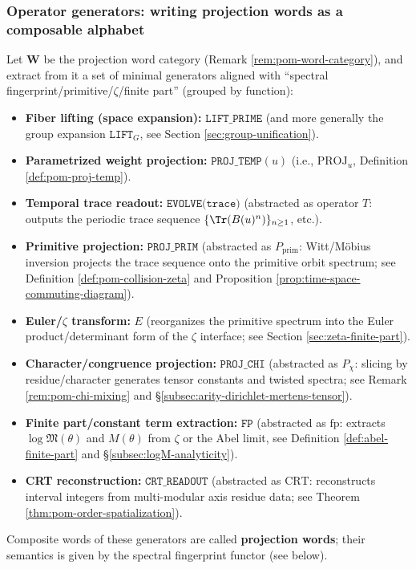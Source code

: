 \subsubsection{Operator generators: writing projection words as a composable alphabet}
\begin{definition}\label{def:pom-operator-generators-min}
Let \(\mathbf{W}\) be the projection word category (Remark \ref{rem:pom-word-category}), and extract from it a set of minimal generators aligned with ``spectral fingerprint/primitive/\(\zeta\)/finite part'' (grouped by function):
\begin{itemize}
  \item \textbf{Fiber lifting (space expansion):} \(\texttt{LIFT\_PRIME}\) (and more generally the group expansion \(\texttt{LIFT}_G\), see Section \ref{sec:group-unification}).
  \item \textbf{Parametrized weight projection:} \(\texttt{PROJ\_TEMP}(u)\) (i.e., \(\mathrm{PROJ}_u\), Definition \ref{def:pom-proj-temp}).
  \item \textbf{Temporal trace readout:} \(\texttt{EVOLVE(trace)}\) (abstracted as operator \(T\): outputs the periodic trace sequence \(\{\Tr(B(u)^n)\}_{n\ge 1}\), etc.).
  \item \textbf{Primitive projection:} \(\texttt{PROJ\_PRIM}\) (abstracted as \(P_{\mathrm{prim}}\): Witt/M\"obius inversion projects the trace sequence onto the primitive orbit spectrum; see Definition \ref{def:pom-collision-zeta} and Proposition \ref{prop:time-space-commuting-diagram}).
  \item \textbf{Euler/\(\zeta\) transform:} \(E\) (reorganizes the primitive spectrum into the Euler product/determinant form of the \(\zeta\) interface; see Section \ref{sec:zeta-finite-part}).
  \item \textbf{Character/congruence projection:} \(\texttt{PROJ\_CHI}\) (abstracted as \(P_\chi\): slicing by residue/character generates tensor constants and twisted spectra; see Remark \ref{rem:pom-chi-mixing} and \S\ref{subsec:arity-dirichlet-mertens-tensor}).
  \item \textbf{Finite part/constant term extraction:} \(\texttt{FP}\) (abstracted as \(\mathrm{fp}\): extracts \(\log\mathfrak{M}(\theta)\) and \(M(\theta)\) from \(\zeta\) or the Abel limit, see Definition \ref{def:abel-finite-part} and \S\ref{subsec:logM-analyticity}).
  \item \textbf{CRT reconstruction:} \(\texttt{CRT\_READOUT}\) (abstracted as \(\mathrm{CRT}\): reconstructs interval integers from multi-modular axis residue data; see Theorem \ref{thm:pom-order-spatialization}).
\end{itemize}
Composite words of these generators are called \textbf{projection words}; their semantics is given by the spectral fingerprint functor (see below).
\end{definition}

